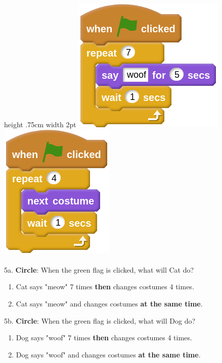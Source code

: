 \documentclass[letterpaper,12pt]{article}
\begin{document}
 \vline height .75cm width 2pt \hspace{1cm}
\includegraphics[scale=.4, valign=t]{q5_script1.png} \hspace{1cm}
\includegraphics[scale=.4, valign=t]{q5_script2.png} \\ \\

\noindent 5a. \textbf{Circle}: When the green flag is clicked, what will Cat do?
\renewcommand{\theenumi}{\Alph{enumi}}
\begin{enumerate}
\item Cat says "meow" 7 times \textbf{then} changes costumes 4 times.
\item Cat says "meow" and changes costumes \textbf{at the same time}. \\
\end{enumerate}

\noindent 5b. \textbf{Circle}: When the green flag is clicked, what will Dog do?
\renewcommand{\theenumi}{\Alph{enumi}}
\begin{enumerate}
\item Dog says "woof" 7 times \textbf{then} changes costumes 4 times.
\item Dog says "woof" and changes costumes \textbf{at the same time}. \\
\end{enumerate}
\end{document}
